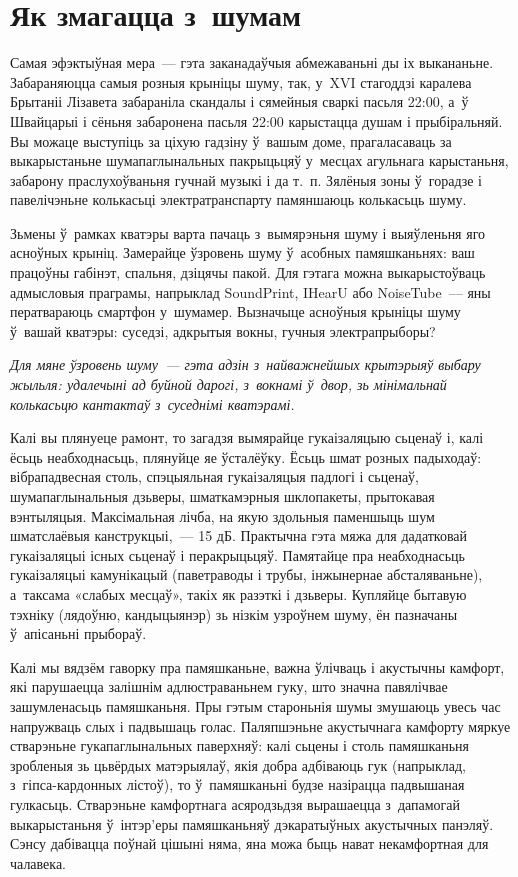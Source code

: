 \section{Як змагацца з~шумам}

Самая эфэктыўная мера~--- гэта заканадаўчыя абмежаваньні ды іх выкананьне. Забараняюцца самыя розныя крыніцы шуму, так, у~XVI стагоддзі каралева Брытаніі Лізавета забараніла скандалы і сямейныя сваркі пасьля 22:00, а~ў Швайцарыі і сёньня забаронена пасьля 22:00 карыстацца душам і прыбіральняй. Вы можаце выступіць за ціхую гадзіну ў~вашым доме, прагаласаваць за выкарыстаньне шумапаглынальных пакрыцьцяў у~месцах агульнага карыстаньня, забарону праслухоўваньня гучнай музыкі і да т.~п. Зялёныя зоны ў~горадзе і павелічэньне колькасьці электратранспарту памяншаюць колькасьць шуму.

Зьмены ў~рамках кватэры варта пачаць з~вымярэньня шуму і выяўленьня яго асноўных крыніц. Замерайце ўзровень шуму ў~асобных памяшканьнях: ваш працоўны габінэт, спальня, дзіцячы пакой. Для гэтага можна выкарыстоўваць адмысловыя праграмы, напрыклад SoundPrint, IHearU або NoiseTube~--- яны ператвараюць смартфон у~шумамер. Вызначыце асноўныя крыніцы шуму ў~вашай кватэры: суседзі, адкрытыя вокны, гучныя электрапрыборы?

\emph{Для мяне ўзровень шуму~--- гэта адзін з~найважнейшых крытэрыяў выбару жыльля: удалечыні ад буйной дарогі, з~вокнамі ў~двор, зь мінімальнай колькасьцю кантактаў з~суседнімі кватэрамі.}

Калі вы плянуеце рамонт, то загадзя вымярайце гукаізаляцыю сьценаў і, калі ёсьць неабходнасьць, плянуйце яе ўсталёўку. Ёсьць шмат розных падыходаў: вібрападвесная столь, спэцыяльная гукаізаляцыя падлогі і сьценаў, шумапаглынальныя дзьверы, шматкамэрныя шклопакеты, прытокавая вэнтыляцыя. Максімальная лічба, на якую здольныя паменшыць шум шматслаёвыя канструкцыі,~--- 15 дБ. Практычна гэта мяжа для дадатковай гукаізаляцыі існых сьценаў і перакрыцьцяў. Памятайце пра неабходнасьць гукаізаляцыі камунікацый (паветраводы і трубы, інжынернае абсталяваньне), а~таксама «слабых месцаў», такіх як разэткі і дзьверы. Купляйце бытавую тэхніку (лядоўню, кандыцыянэр) зь нізкім узроўнем шуму, ён пазначаны ў~апісаньні прыбораў.

Калі мы вядзём гаворку пра памяшканьне, важна ўлічваць і акустычны камфорт, які парушаецца залішнім адлюстраваньнем гуку, што значна павялічвае зашумленасьць памяшканьня. Пры гэтым староньнія шумы змушаюць увесь час напружваць слых і падвышаць голас. Паляпшэньне акустычнага камфорту мяркуе стварэньне гукапаглынальных паверхняў: калі сьцены і столь памяшканьня зробленыя зь цьвёрдых матэрыялаў, якія добра адбіваюць гук (напрыклад, з~гіпса-кардонных лістоў), то ў~памяшканьні будзе назірацца падвышаная гулкасьць. Стварэньне камфортнага асяродзьдзя вырашаецца з~дапамогай выкарыстаньня ў~інтэр'еры памяшканьняў дэкаратыўных акустычных панэляў. Сэнсу дабівацца поўнай цішыні няма, яна можа быць нават некамфортная для чалавека.

